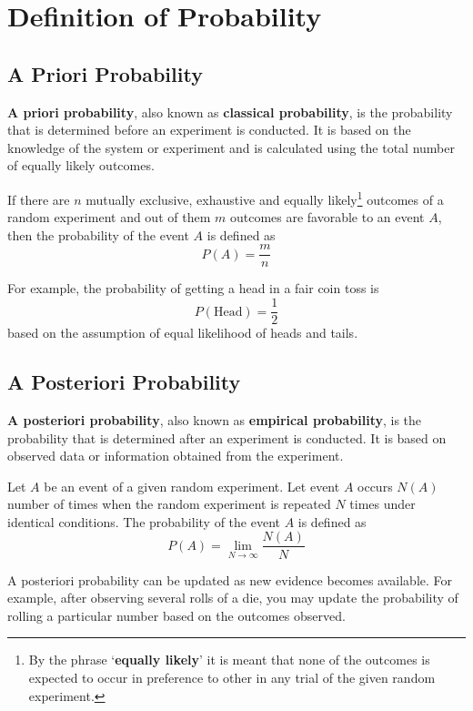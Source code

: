 \documentclass[twoside]{book}
\begin{document}
\section{Definition of Probability}

\subsection{A Priori Probability}
    \textbf{A priori probability}, also known as \textbf{classical probability}, is the probability that is determined before an experiment is conducted. It is based on the knowledge of the system or experiment and is calculated using the total number of equally likely outcomes. 
    
    \begin{textbox}
        If there are $n$ mutually exclusive, exhaustive and equally likely\footnote{By the phrase `\textbf{equally likely}' it is meant that none of the outcomes is expected to occur in preference to other in any trial of the given random experiment.} outcomes of a random experiment and out of them $m$ outcomes are favorable to an event $A$, then the probability of the event $A$ is defined as $$P(A) = \dfrac{m}{n}$$
    \end{textbox}
    For example, the probability of getting a head in a fair coin toss is $$P(\text{Head}) = \frac{1}{2}$$ based on the assumption of equal likelihood of heads and tails.

    \subsection{A Posteriori Probability}
    \textbf{A posteriori probability}, also known as \textbf{empirical probability}, is the probability that is determined after an experiment is conducted. It is based on observed data or information obtained from the experiment. 

    \begin{textbox}
        Let $A$ be an event of a given random experiment. Let event $A$ occurs $N(A)$ number of times when the random experiment is repeated $N$ times under identical conditions. The probability of the event $A$ is defined as $$P(A) = \lim_{N\to \infty}\dfrac{N(A)}{N}$$
    \end{textbox}
    
    A posteriori probability can be updated as new evidence becomes available. For example, after observing several rolls of a die, you may update the probability of rolling a particular number based on the outcomes observed.
\end{document}
